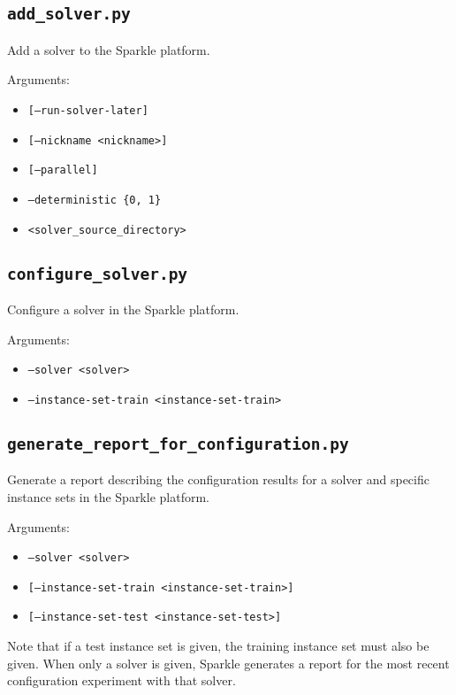 \documentclass{article}
\begin{document}
\subsection{\texttt{add\_solver.py}}
\label{cmd:add_solver}
Add a solver to the Sparkle platform.

Arguments:
\begin{itemize}[noitemsep]
  \item[] \texttt{[--run-solver-later]}
  \item[] \texttt{[--nickname <nickname>]}
  \item[] \texttt{[--parallel]}
  \item[] \texttt{--deterministic \{0, 1\}}
  \item[] \texttt{<solver\_source\_directory>}
\end{itemize}

\subsection{\texttt{configure\_solver.py}}
\label{cmd:configure_solver}
Configure a solver in the Sparkle platform.

Arguments:
\begin{itemize}[noitemsep]
  \item[] \texttt{--solver <solver>}
  \item[] \texttt{--instance-set-train <instance-set-train>}
\end{itemize}

\subsection{\texttt{generate\_report\_for\_configuration.py}}
\label{cmd:generate_report_for_configuration}
Generate a report describing the configuration results for a solver and specific instance sets in the Sparkle platform.

Arguments:
\begin{itemize}[noitemsep]
  \item[] \texttt{--solver <solver>}
  \item[] \texttt{[--instance-set-train <instance-set-train>]}
  \item[] \texttt{[--instance-set-test <instance-set-test>]}
\end{itemize}

Note that if a test instance set is given, the training instance set must also be given. When only a solver is given, Sparkle generates a report for the most recent configuration experiment with that solver.
\end{document}
